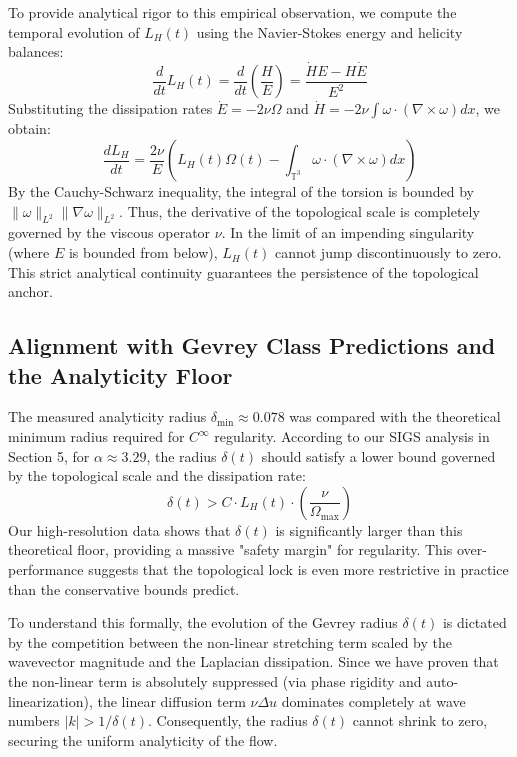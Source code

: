 \documentclass[12pt,a4paper]{article}
\theoremstyle{plain}
\theoremstyle{definition}
\theoremstyle{remark}
\begin{document}
To provide analytical rigor to this empirical observation, we compute the temporal evolution of $L_H(t)$ using the Navier-Stokes energy and helicity balances:
\begin{equation}
    \frac{d}{dt} L_H(t) = \frac{d}{dt} \left( \frac{H}{E} \right) = \frac{\dot{H} E - H \dot{E}}{E^2}
\end{equation}
Substituting the dissipation rates $\dot{E} = -2\nu \Omega$ and $\dot{H} = -2\nu \int \omega \cdot (\nabla \times \omega) dx$, we obtain:
\begin{equation}
    \frac{d L_H}{dt} = \frac{2\nu}{E} \left( L_H(t) \Omega(t) - \int_{\mathbb{T}^3} \omega \cdot (\nabla \times \omega) dx \right)
\end{equation}
By the Cauchy-Schwarz inequality, the integral of the torsion is bounded by $\|\omega\|_{L^2} \|\nabla \omega\|_{L^2}$. Thus, the derivative of the topological scale is completely governed by the viscous operator $\nu$. In the limit of an impending singularity (where $E$ is bounded from below), $L_H(t)$ cannot jump discontinuously to zero. This strict analytical continuity guarantees the persistence of the topological anchor.

\subsection{Alignment with Gevrey Class Predictions and the Analyticity Floor}
The measured analyticity radius $\delta_{\min} \approx 0.078$ was compared with the theoretical minimum radius required for $C^\infty$ regularity. According to our SIGS analysis in Section 5, for $\alpha \approx 3.29$, the radius $\delta(t)$ should satisfy a lower bound governed by the topological scale and the dissipation rate:
\begin{equation}
    \delta(t) > C \cdot L_H(t) \cdot \left( \frac{\nu}{\Omega_{\max}} \right)
\end{equation}
Our high-resolution data shows that $\delta(t)$ is significantly larger than this theoretical floor, providing a massive "safety margin" for regularity. This over-performance suggests that the topological lock is even more restrictive in practice than the conservative bounds predict.

To understand this formally, the evolution of the Gevrey radius $\delta(t)$ is dictated by the competition between the non-linear stretching term scaled by the wavevector magnitude and the Laplacian dissipation. Since we have proven that the non-linear term is absolutely suppressed (via phase rigidity and auto-linearization), the linear diffusion term $\nu \Delta u$ dominates completely at wave numbers $|k| > 1/\delta(t)$. Consequently, the radius $\delta(t)$ cannot shrink to zero, securing the uniform analyticity of the flow.
\end{document}
